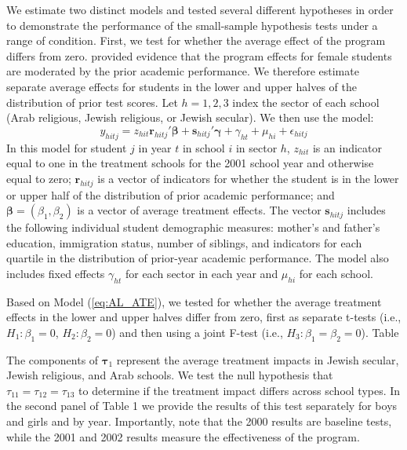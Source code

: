 \documentclass[12pt]{article}\usepackage[]{graphicx}\usepackage[]{color}
\newcommand{\bm}{\mathbf}
\newcommand{\bs}{\boldsymbol}
\begin{document}
We estimate two distinct models and tested several different hypotheses in order to demonstrate the performance of the small-sample hypothesis tests under a range of condition. First, we test for whether the average effect of the program differs from zero. \citet{Angrist2009effects} provided evidence that the program effects for female students are moderated by the prior academic performance. We therefore estimate separate average effects for students in the lower and upper halves of the distribution of prior test scores. Let $h = 1,2,3$ index the sector of each school (Arab religious, Jewish religious, or Jewish secular). We then use the model: 
\begin{equation}
\label{eq:AL_ATE}
y_{hitj} = z_{hit}\bm{r}_{hitj}'\bs\beta + \bm{s}_{hitj}'\bs\gamma + \gamma_{ht} + \mu_{hi} + \epsilon_{hitj}
\end{equation}
In this model for student $j$ in year $t$ in school $i$ in sector $h$, $z_{hit}$ is an indicator equal to one in the treatment schools for the 2001 school year and otherwise equal to zero; $\bm{r}_{hitj}$ is a vector of indicators for whether the student is in the lower or upper half of the distribution of prior academic performance; and $\bs\beta = \left(\beta_1, \beta_2\right)$ is a vector of average treatment effects. The vector $\bm{s}_{hitj}$ includes the following individual student demographic measures: mother's and father's education, immigration status, number of siblings, and indicators for each quartile in the distribution of prior-year academic performance. The model also includes fixed effects $\gamma_{ht}$ for each sector in each year and $\mu_{hi}$ for each school. 

Based on Model (\ref{eq:AL_ATE}), we tested for whether the average treatment effects in the lower and upper halves differ from zero, first as separate t-tests (i.e., $H_1: \beta_1 = 0$, $H_2: \beta_2 = 0$) and then using a joint F-test (i.e., $H_3: \beta_1 = \beta_2 = 0$). Table 






The components of $\bs\tau_1$ represent the average treatment impacts in Jewish secular, Jewish religious, and Arab schools. We test the null hypothesis that $\tau_{11} = \tau_{12} = \tau_{13}$ to determine if the treatment impact differs across school types. In the second panel of Table 1 we provide the results of this test separately for boys and girls and by year. Importantly, note that the 2000 results are baseline tests, while the 2001 and 2002 results measure the effectiveness of the program.
\end{document}
